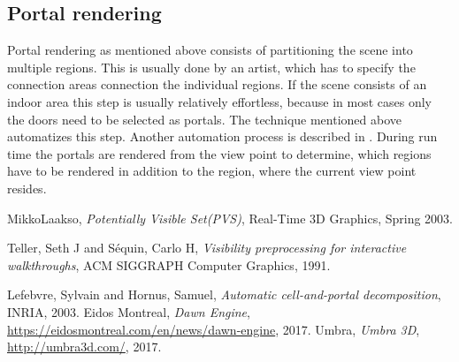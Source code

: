 \documentclass[a4paper]{article}
\begin{document}
\subsection{Portal rendering}
Portal rendering as mentioned above consists of partitioning the scene into multiple regions. This is usually done by an artist, which has to specify the connection areas connection the individual regions. If the scene consists of an indoor area this step is
usually relatively effortless, because in most cases only the doors need to be selected as portals. The technique mentioned above automatizes this step. Another automation process is described in \cite{autoportal}. \newline
During run time the portals are rendered from the view point to determine, which regions have to be rendered in addition to the region, where the current view point resides.  

\newpage

\renewcommand{\refname}{\section{References and Further Sources}}
\begin{thebibliography}{1}
  
	MikkoLaakso,
	 \emph{  Potentially Visible Set(PVS)},	 
	 Real-Time 3D Graphics,
	 Spring 2003.
	 
	Teller, Seth J and S{\'e}quin, Carlo H,
	 \emph{ Visibility preprocessing for interactive walkthroughs},	 
	 ACM SIGGRAPH Computer Graphics,
	 1991.
	 
	Lefebvre, Sylvain and Hornus, Samuel,
	 \emph{ Automatic cell-and-portal decomposition},	 
	 INRIA,
	 2003.
	Eidos Montreal,
	 \emph{ Dawn Engine},	 
	 \url{https://eidosmontreal.com/en/news/dawn-engine},
	 2017.
	Umbra,
	 \emph{ Umbra 3D},	 
	 \url{http://umbra3d.com/},
	 2017.




\end{thebibliography}
\end{document}
